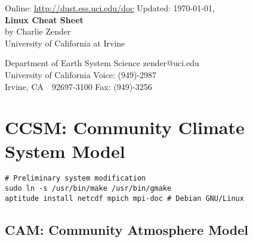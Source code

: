 \documentclass[12pt,twoside]{article}
\begin{document}
\begin{center}
Online: \url{http://dust.ess.uci.edu/doc} \hfill Updated: \shortdate\today, \xxivtime\\
\bigskip
{\Large \textbf{Linux Cheat Sheet}}\\
\bigskip
by Charlie Zender\\
University of California at Irvine\\
\end{center}
Department of Earth System Science \hfill zender@uci.edu\\
University of California \hfill Voice: (949)-2987\\
Irvine, CA~~92697-3100 \hfill Fax: (949)-3256

\setcounter{page}{1}
\pagestyle{headings}
\thispagestyle{empty}
\tableofcontents
\listoftables
{}
\setcounter{page}{1}
\thispagestyle{empty}

\clearpage
\section{CCSM: Community Climate System Model}
\begin{verbatim}
# Preliminary system modification
sudo ln -s /usr/bin/make /usr/bin/gmake
aptitude install netcdf mpich mpi-doc # Debian GNU/Linux
\end{verbatim}
\subsection{CAM: Community Atmosphere Model}
\end{document}
